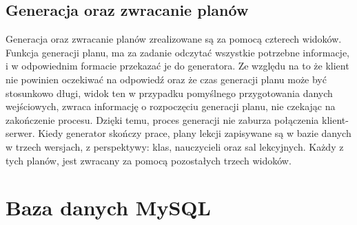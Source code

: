 \subsection{Generacja oraz zwracanie planów}
Generacja oraz zwracanie planów zrealizowane są za pomocą czterech widoków. Funkcja generacji planu, ma za zadanie odczytać wszystkie potrzebne informacje, i w odpowiednim formacie przekazać je do generatora. Ze względu na to że klient nie powinien oczekiwać na odpowiedź oraz że czas generacji planu może być stosunkowo długi, widok ten w przypadku pomyślnego przygotowania danych wejściowych, zwraca informację o rozpoczęciu generacji planu, nie czekając na zakończenie procesu. Dzięki temu, proces generacji nie zaburza połączenia klient-serwer. Kiedy generator skończy prace, plany lekcji zapisywane są w bazie danych w trzech wersjach, z perspektywy: klas, nauczycieli oraz sal lekcyjnych.
Każdy z tych planów, jest zwracany za pomocą pozostałych trzech widoków.

\section{Baza danych MySQL}